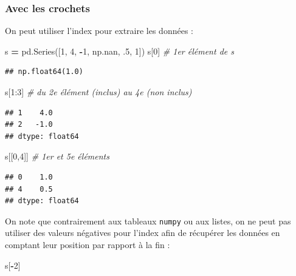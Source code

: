 \documentclass[
  12pt,
]{book}
\newenvironment{Shaded}{\begin{snugshade}}{\end{snugshade}}
\newcommand{\CommentTok}[1]{\textcolor[rgb]{0.56,0.35,0.01}{\textit{#1}}}
\newcommand{\DecValTok}[1]{\textcolor[rgb]{0.00,0.00,0.81}{#1}}
\newcommand{\FloatTok}[1]{\textcolor[rgb]{0.00,0.00,0.81}{#1}}
\newcommand{\NormalTok}[1]{#1}
\newcommand{\OperatorTok}[1]{\textcolor[rgb]{0.81,0.36,0.00}{\textbf{#1}}}
\numberwithin{equation}{section}
\numberwithin{countremarque}{section}
\begin{document}
\subsubsection{Avec les crochets}\label{avec-les-crochets}

On peut utiliser l'index pour extraire les données :

\begin{Shaded}
\begin{Highlighting}[]
\NormalTok{s }\OperatorTok{=}\NormalTok{ pd.Series([}\DecValTok{1}\NormalTok{, }\DecValTok{4}\NormalTok{, }\OperatorTok{{-}}\DecValTok{1}\NormalTok{, np.nan, }\FloatTok{.5}\NormalTok{, }\DecValTok{1}\NormalTok{])}
\NormalTok{s[}\DecValTok{0}\NormalTok{] }\CommentTok{\# 1er élément de s}
\end{Highlighting}
\end{Shaded}

\begin{lstlisting}
## np.float64(1.0)
\end{lstlisting}

\begin{Shaded}
\begin{Highlighting}[]
\NormalTok{s[}\DecValTok{1}\NormalTok{:}\DecValTok{3}\NormalTok{] }\CommentTok{\# du 2e élément (inclus) au 4e (non inclus)}
\end{Highlighting}
\end{Shaded}

\begin{lstlisting}
## 1    4.0
## 2   -1.0
## dtype: float64
\end{lstlisting}

\begin{Shaded}
\begin{Highlighting}[]
\NormalTok{s[[}\DecValTok{0}\NormalTok{,}\DecValTok{4}\NormalTok{]] }\CommentTok{\# 1er et 5e éléments}
\end{Highlighting}
\end{Shaded}

\begin{lstlisting}
## 0    1.0
## 4    0.5
## dtype: float64
\end{lstlisting}

On note que contrairement aux tableaux \texttt{numpy} ou aux listes, on ne peut pas utiliser des valeurs négatives pour l'index afin de récupérer les données en comptant leur position par rapport à la fin :

\begin{Shaded}
\begin{Highlighting}[]
\NormalTok{s[}\OperatorTok{{-}}\DecValTok{2}\NormalTok{]}
\end{Highlighting}
\end{Shaded}
\end{document}
